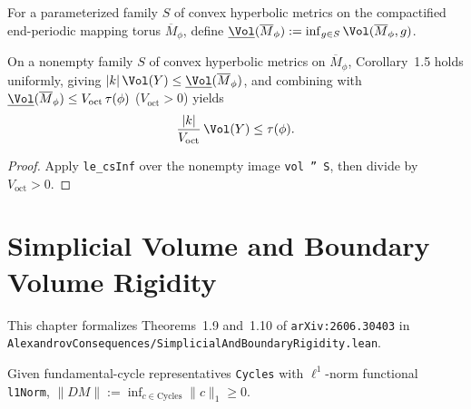 \begin{definition}
\label{def_infimal_convex_volume}
\leanok
For a parameterized family $S$ of convex hyperbolic metrics on the compactified end-periodic
mapping torus $\overline{M}_\phi$, define $\underline{\Vol}(\overline{M}_\phi) := \inf_{g \in S} \Vol(\overline{M}_\phi, g)$.
\end{definition}

\begin{corollary}
\label{cor_translation_length}
\leanok
{}
On a nonempty family $S$ of convex hyperbolic metrics on $\overline{M}_\phi$, Corollary~1.5 holds
uniformly, giving $|k|\,\Vol(Y) \le \underline{\Vol}(\overline{M}_\phi)$, and combining with
$\underline{\Vol}(\overline{M}_\phi) \le V_{\mathrm{oct}}\,\tau(\phi)$ ($V_{\mathrm{oct}} > 0$) yields
\[
  \frac{|k|}{V_{\mathrm{oct}}}\,\Vol(Y) \le \tau(\phi).
\]
\end{corollary}
\begin{proof}\leanok
Apply \texttt{le\_csInf} over the nonempty image \texttt{vol '' S}, then divide by $V_{\mathrm{oct}} > 0$.
\end{proof}

\chapter{Simplicial Volume and Boundary Volume Rigidity}

This chapter formalizes Theorems~1.9 and~1.10 of \texttt{arXiv:2606.30403} in
\texttt{AlexandrovConsequences/SimplicialAndBoundaryRigidity.lean}.

\begin{definition}
\label{def_gromov_simplicial_volume}
\leanok
Given fundamental-cycle representatives \texttt{Cycles} with $\ell^1$-norm functional \texttt{l1Norm},
$\|DM\| := \inf_{c \in \mathrm{Cycles}} \|c\|_1 \ge 0$.
\end{definition}

